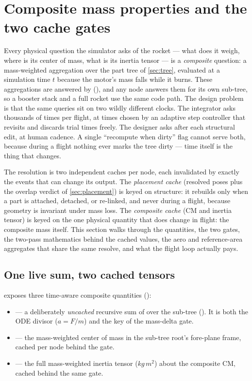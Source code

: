 \section{Composite mass properties and the two cache gates}\label{sec:caching}

Every physical question the simulator asks of the rocket --- what does it weigh, where is its
center of mass, what is its inertia tensor --- is a \emph{composite} question: a mass-weighted
aggregation over the part tree of \cref{sec:tree}, evaluated at a simulation time $t$ because the
motor's mass falls while it burns. These aggregations are answered by 
(), and any node answers them for its own sub-tree, so a booster
stack and a full rocket use the same code path. The design problem is that the same queries sit on
two wildly different clocks. The integrator asks thousands of times per flight, at times chosen by
an adaptive step controller that revisits and discards trial times freely. The designer asks after
each structural edit, at human cadence. A single ``recompute when dirty'' flag cannot serve both,
because during a flight nothing ever marks the tree dirty --- time itself is the thing that
changes.

The resolution is two independent caches per node, each invalidated by exactly the events that can
change its output. The \emph{placement cache} (resolved poses plus the overlap verdict of
\cref{sec:placement}) is keyed on structure: it rebuilds only when a part is attached, detached, or
re-linked, and never during a flight, because geometry is invariant under mass loss. The
\emph{composite cache} (CM and inertia tensor) is keyed on the one physical quantity that does
change in flight: the composite mass itself. This section walks through the quantities, the two
gates, the two-pass mathematics behind the cached values, the aero and reference-area aggregates
that share the same resolve, and what the flight loop actually pays.

\subsection{One live sum, two cached tensors}\label{sec:caching-quantities}

 exposes three time-aware composite quantities
():

\begin{itemize}
\item {} --- a deliberately \emph{uncached} recursive sum of
       over the sub-tree (). It is both
      the ODE divisor ($a = F/m$) and the key of the mass-delta gate.
\item {} --- the mass-weighted center of mass in the sub-tree root's
      fore-plane frame, cached per node behind the gate.
\item {} --- the full mass-weighted inertia tensor
      ($\unit{kg\,m^2}$) about the composite CM, cached behind the same gate.
\end{itemize}

